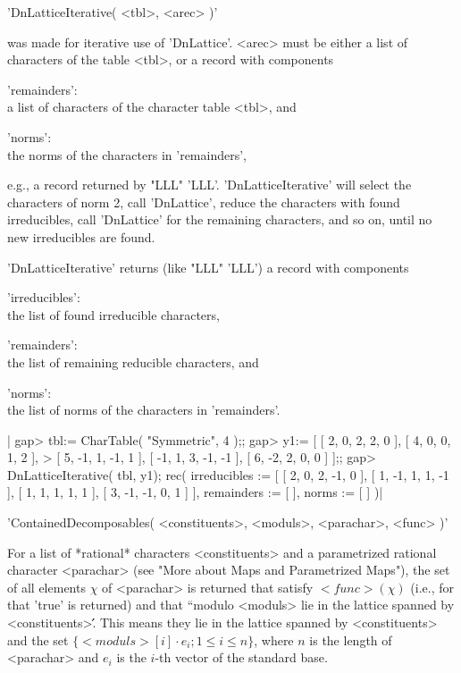 \vspace{5mm}
'DnLatticeIterative( <tbl>, <arec> )'%

was made for iterative  use of 'DnLattice'. <arec> must  be either a list
of characters of the table <tbl>, or a record with components

'remainders':\\
       a list of characters of the character table <tbl>, and

'norms':\\
       the norms of the characters in 'remainders',

e.g., a record returned by "LLL" 'LLL'.  'DnLatticeIterative' will select
the characters  of norm 2,  call 'DnLattice', reduce the  characters with
found irreducibles, call 'DnLattice' for the remaining characters, and so
on, until no new irreducibles are found.

'DnLatticeIterative' returns (like "LLL" 'LLL') a record with components

'irreducibles':\\
     the list of found irreducible characters,

'remainders':\\
     the list of remaining reducible characters, and

'norms':\\
     the list of norms of the characters in 'remainders'.

|    gap> tbl:= CharTable( "Symmetric", 4 );;
    gap> y1:= [ [ 2, 0, 2, 2, 0 ], [ 4, 0, 0, 1, 2 ],
    >   [ 5, -1, 1, -1, 1 ], [ -1, 1, 3, -1, -1 ], [ 6, -2, 2, 0, 0 ] ];;
    gap> DnLatticeIterative( tbl, y1);
    rec(
      irreducibles :=
       [ [ 2, 0, 2, -1, 0 ], [ 1, -1, 1, 1, -1 ], [ 1, 1, 1, 1, 1 ],
          [ 3, -1, -1, 0, 1 ] ],
      remainders := [  ],
      norms := [  ] )|


'ContainedDecomposables( <constituents>, <moduls>, <parachar>, <func> )'

For a list of  *rational*  characters <constituents> and  a  parametrized
rational character  <parachar>   (see "More about Maps   and Parametrized
Maps"),  the set of  all elements $\chi$ of   <parachar> is returned that
satisfy  $<func>( \chi )$  (i.e., for that  'true' is  returned) and that
``modulo <moduls> lie in the  lattice spanned by <constituents>\'\'. This
means they lie in  the lattice spanned by  <constituents> and the set $\{
<moduls>[i]\cdot  e_i; 1\leq  i\leq  n\}$, where   $n$  is the length  of
<parachar> and $e_i$ is the $i$-th vector of the standard base.

